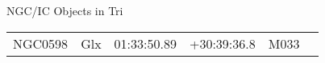 \begin{block}{NGC/IC Objects in Tri}
  \centering
  \begin{tabularx}{\textwidth}{llrrll} \toprule 
    NGC0598 & Glx & 01:33:50.89 & +30:39:36.8  & M033 \\ 
  \end{tabularx}
\end{block}